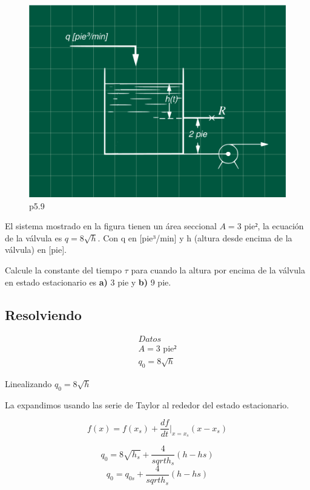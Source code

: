 \documentclass[
  letterpaper,
  DIV=11,
  numbers=noendperiod]{scrreprt}
\begin{document}
\begin{figure}

{\centering \includegraphics{././images/p5.2-coughanowr/headercontrol.png}

}

\caption{p5.9}

\end{figure}

El sistema mostrado en la figura tienen un área seccional
\(A=3\text{ pie²}\), la ecuación de la válvula es \(q=8\sqrt{h}\). Con q
en {[}pie³/min{]} y h (altura desde encima de la válvula) en {[}pie{]}.

Calcule la constante del tiempo \(\tau\) para cuando la altura por
encima de la válvula en estado estacionario es \textbf{a)} 3 pie y
\textbf{b)} 9 pie.

\hypertarget{resolviendo}{%
\subsection{Resolviendo}\label{resolviendo}}

\[
\begin{array}{l}
Datos\\
A = 3 \text{ pie²}\\
q_0=8 \sqrt{h}
\end{array}
\]

Linealizando \(q_0=8 \sqrt h\)

La expandimos usando las serie de Taylor al rededor del estado
estacionario.

\[
f(x) = f(x_s)+\frac{df}{dt}\bigg |_{x=x_s} (x-x_s)
\]

\[
q_0=8\sqrt{h_s}+\frac{4}{sqrt{h_s}}(h-hs)
\] \[
q_0=q_{0s}+\frac{4}{sqrt{h_s}}(h-hs)
\]
\end{document}
